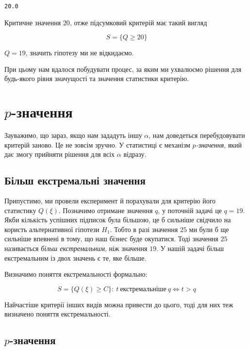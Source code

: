 \documentclass[
  letterpaper,
  10pt,
  openany]{report}
\theoremstyle{definition}
\theoremstyle{remark}
\begin{document}
\begin{verbatim}
20.0
\end{verbatim}

Критичне значення \(20\), отже підсумковий критерій має такий вигляд

\[
S = \{Q \geqslant 20\}
\]

\(Q = 19\), значить гіпотезу ми не відкидаємо.

При цьому нам вдалося побудувати процес, за яким ми ухвалюємо рішення
для будь-якого рівня значущості та значення статистики критерію.

\section{\texorpdfstring{\(p\)-значення}{p-значення}}\label{p-ux437ux43dux430ux447ux435ux43dux43dux44f}

Зауважимо, що зараз, якщо нам зададуть іншу \(\alpha\), нам доведеться
перебудовувати критерій заново. Це не зовсім зручно. У статистиці є
механізм \emph{\(p\)-значення}, який дає змогу прийняти рішення для всіх
\(\alpha\) відразу.

\subsection{Більш екстремальні
значення}\label{ux431ux456ux43bux44cux448-ux435ux43aux441ux442ux440ux435ux43cux430ux43bux44cux43dux456-ux437ux43dux430ux447ux435ux43dux43dux44f}

Припустимо, ми провели експеримент й порахували для критерію його
статистику \(Q(\xi)\). Позначимо отримане значення \(q\), у поточній
задачі це \(q = 19\). Якби кількість успішних підписок була більшою, це
б сильніше свідчило на користь альтернативної гіпотези \(H_1\). Тобто в
разі значення \(25\) ми були б ще сильніше впевнені в тому, що наш
бізнес буде окупатися. Тоді значення \(25\) називається \emph{більш
екстремальним}, ніж значення \(19\). У нашій задачі більш екстремальним
із двох значень є те, яке більше.

Визначимо поняття екстремальності формально:

\[
S = \{Q(\xi) \geqslant C\}:\ t\ \text{екстремальніше}\ q \Leftrightarrow t > q 
\]

Найчастіше критерії інших видів можна привести до цього, тоді для них
теж визначено поняття екстремальності.

\subsection{\texorpdfstring{\(p\)-значення}{p-значення}}\label{p-ux437ux43dux430ux447ux435ux43dux43dux44f-1}
\end{document}
